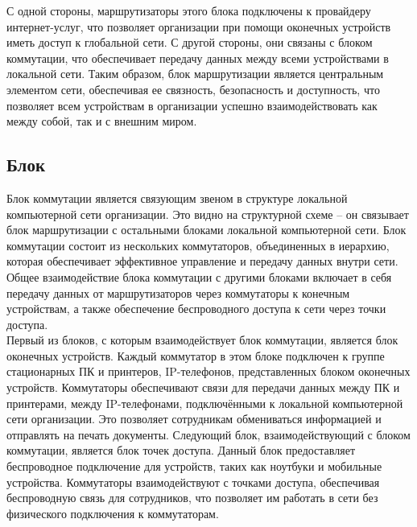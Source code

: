 С одной стороны, маршрутизаторы этого блока подключены к провайдеру интернет-услуг, что позволяет организации при помощи оконечных устройств иметь доступ к глобальной сети.
С другой стороны, они связаны с блоком коммутации, что обеспечивает передачу данных между всеми устройствами в локальной сети.
Таким образом, блок маршрутизации является центральным элементом сети, обеспечивая ее связность, безопасность и доступность, что позволяет всем устройствам в организации успешно взаимодействовать как между собой, так и с внешним миром.

\subsection{Блок \moduleCommutation}\label{subsec:struct:ModuleCommutation}
    Блок коммутации является связующим звеном в структуре локальной компьютерной сети организации.
Это видно на структурной схеме – он связывает блок маршрутизации с остальными блоками локальной компьютерной сети.
Блок коммутации состоит из нескольких коммутаторов, объединенных в иерархию, которая обеспечивает эффективное управление и передачу данных внутри сети.
Общее взаимодействие блока коммутации с другими блоками включает в себя передачу данных от маршрутизаторов через коммутаторы к конечным устройствам, а также обеспечение беспроводного доступа к сети через точки доступа. \\
    Первый из блоков, с которым взаимодействует блок коммутации, является блок оконечных устройств.
Каждый коммутатор в этом блоке подключен к группе стационарных ПК и принтеров, IP-телефонов, представленных блоком оконечных устройств.
Коммутаторы обеспечивают связи для передачи данных между ПК и принтерами, между IP-телефонами, подключёнными к локальной компьютерной сети организации.
Это позволяет сотрудникам обмениваться информацией и отправлять на печать документы.
    Следующий блок, взаимодействующий с блоком коммутации, является блок точек доступа.
Данный блок предоставляет беспроводное подключение для устройств, таких как ноутбуки и мобильные устройства.
Коммутаторы взаимодействуют с точками доступа, обеспечивая беспроводную связь для сотрудников, что позволяет им работать в сети без физического подключения к коммутаторам.

